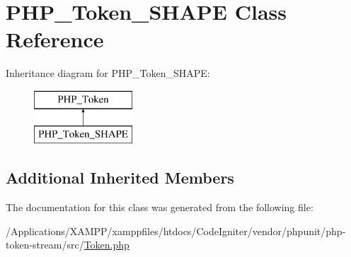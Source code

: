 \hypertarget{class_p_h_p___token___s_h_a_p_e}{}\section{P\+H\+P\+\_\+\+Token\+\_\+\+S\+H\+A\+PE Class Reference}
\label{class_p_h_p___token___s_h_a_p_e}
Inheritance diagram for P\+H\+P\+\_\+\+Token\+\_\+\+S\+H\+A\+PE\+:\begin{figure}[H]
\begin{center}
\leavevmode
\includegraphics[height=2.000000cm]{class_p_h_p___token___s_h_a_p_e}
\end{center}
\end{figure}
\subsection*{Additional Inherited Members}


The documentation for this class was generated from the following file\+:\begin{DoxyCompactItemize}
\item 
/\+Applications/\+X\+A\+M\+P\+P/xamppfiles/htdocs/\+Code\+Igniter/vendor/phpunit/php-\/token-\/stream/src/\mbox{\hyperlink{_token_8php}{Token.\+php}}\end{DoxyCompactItemize}
